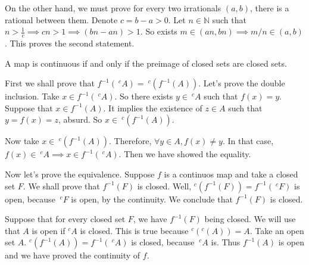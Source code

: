 \begin{enumerate}
\begin{remark}
        On the other hand, we must prove for every two irrationals $(a,b)$,
        there is a rational between them. Denote $c = b - a > 0$. Let $n\in
        \mathbb{N}$ such that $n > \frac{1}{c} \implies cn > 1 \implies (bn -
        an) > 1$. So exists $m \in (an, bn) \implies m/n \in (a,b)$. This
        proves the second statement.   
    \end{remark}
\end{enumerate}

\noindent\linia

\begin{exercise}
    A map is continuous if and only if the preimage of closed sets are closed sets.
\end{exercise}

First we shall prove that $f^{-1}(~^cA) = ~^c(f^{-1}(A))$. Let's prove the
double inclusion. Take $x \in f^{-1}(~^cA)$. So there exists $y \in ~^cA$ such
that $f(x) = y$. Suppose that $x \in f^{-1}(A)$. It implies the existence of
$z \in A$ such that $y = f(x) = z$, absurd. So $x \in ~^c(f^{-1}(A))$.

Now take $x \in ~^c(f^{-1}(A))$. Therefore, $\forall y \in A, f(x) \neq y$. In
that case, $f(x) \in ~^cA \implies x \in f^{-1}(~^cA)$. Then we have showed
the equality. 

\vspace{5mm}

Now let's prove the equivalence. Suppose $f$ is a continuos map and take a
closed set $F$. We shall prove that $f^{-1}(F)$ is closed. Well, $^c(f^{-1}(F))
= f^{-1}(~^cF)$ is open, because $~^cF$ is open, by the continuity. We
conclude that $f^{-1}(F)$ is closed. 

Suppose that for every closed set $F$, we have $f^{-1}(F)$ being closed. We
will use that $A$ is open if $^cA$ is closed. This is true because $^c(^c(A))
= A$. Take an open set $A$. $^c(f^{-1}(A)) = f^{-1}(~^cA)$
is closed, because $~^cA$ is. Thus $f^{-1}(A)$ is open and we have proved the
continuity of $f$. 
